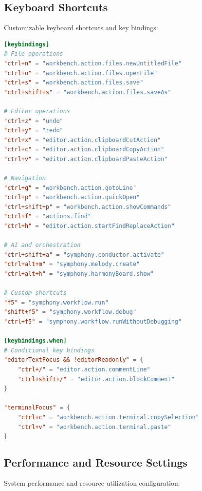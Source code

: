 \subsection*{Keyboard Shortcuts}

Customizable keyboard shortcuts and key bindings:

\begin{lstlisting}[language=toml,caption={Keyboard Shortcuts Configuration}]
[keybindings]
# File operations
"ctrl+n" = "workbench.action.files.newUntitledFile"
"ctrl+o" = "workbench.action.files.openFile"
"ctrl+s" = "workbench.action.files.save"
"ctrl+shift+s" = "workbench.action.files.saveAs"

# Editor operations
"ctrl+z" = "undo"
"ctrl+y" = "redo"
"ctrl+x" = "editor.action.clipboardCutAction"
"ctrl+c" = "editor.action.clipboardCopyAction"
"ctrl+v" = "editor.action.clipboardPasteAction"

# Navigation
"ctrl+g" = "workbench.action.gotoLine"
"ctrl+p" = "workbench.action.quickOpen"
"ctrl+shift+p" = "workbench.action.showCommands"
"ctrl+f" = "actions.find"
"ctrl+h" = "editor.action.startFindReplaceAction"

# AI and orchestration
"ctrl+shift+a" = "symphony.conductor.activate"
"ctrl+alt+m" = "symphony.melody.create"
"ctrl+alt+h" = "symphony.harmonyBoard.show"

# Custom shortcuts
"f5" = "symphony.workflow.run"
"shift+f5" = "symphony.workflow.debug"
"ctrl+f5" = "symphony.workflow.runWithoutDebugging"

[keybindings.when]
# Conditional key bindings
"editorTextFocus && !editorReadonly" = {
    "ctrl+/" = "editor.action.commentLine"
    "ctrl+shift+/" = "editor.action.blockComment"
}

"terminalFocus" = {
    "ctrl+c" = "workbench.action.terminal.copySelection"
    "ctrl+v" = "workbench.action.terminal.paste"
}
\end{lstlisting}

\subsection*{Performance and Resource Settings}

System performance and resource utilization configuration:

